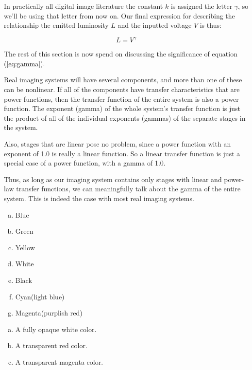 In practically all digital image literature the constant $k$ is
assigned the letter $\gamma$, so we'll be using that letter from now
on. Our final expression for describing the relationship the emitted
luminosity $L$ and the inputted voltage $V$ is thus:

\begin{equation}
  \label{eq:gamma}
  L = V^\gamma
\end{equation}

The rest of this section is now spend on discussing the significance
of equation (\ref{eq:gamma}).

Real imaging systems will have several components, and more than one
of these can be nonlinear. If all of the components have transfer
characteristics that are power functions, then the transfer function
of the entire system is also a power function. The exponent (gamma) of
the whole system's transfer function is just the product of all of the
individual exponents (gammas) of the separate stages in the system.

Also, stages that are linear pose no problem, since a power function
with an exponent of 1.0 is really a linear function. So a linear
transfer function is just a special case of a power function, with a
gamma of 1.0.

Thus, as long as our imaging system contains only stages with linear
and power-law transfer functions, we can meaningfully talk about the
gamma of the entire system. This is indeed the case with most real
imaging systems.

\begin{Answer}[ref={rgb-triplet}]
  \begin{enumerate}[(a)]
  \item Blue
  \item Green
  \item Yellow
  \item White
  \item Black
  \item Cyan(light blue)
  \item Magenta(purplish red)
  \end{enumerate}
\end{Answer}

\begin{Answer}[ref={tga-16-bit}]

  \begin{enumerate}[(a)]
  \item A fully opaque white color.
  \item A transparent red color.
  \item A transparent magenta color.
  \end{enumerate}

\end{Answer}


